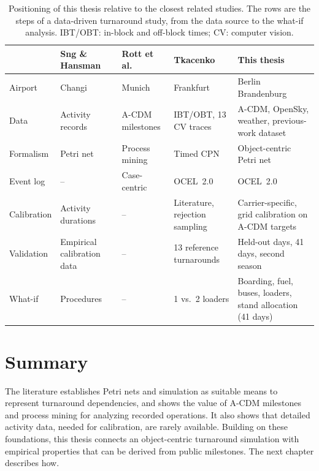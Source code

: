 \begin{table}[htbp]\centering\footnotesize
\begin{tabular}{p{2.1cm}p{2.2cm}p{2.2cm}p{2.4cm}p{2.7cm}}\hline
& Sng \& Hansman~\cite{sng2019petri} & Rott et al.~\cite{rott2023processmining} & Tkacenko~\cite{tkacenko2026} & This thesis\\\hline
Airport & Changi & Munich & Frankfurt & Berlin Brandenburg\\\hline
Data & Activity records & A-CDM milestones & IBT/OBT, 13 CV traces & A-CDM, OpenSky, weather, previous-work dataset\\\hline
Formalism & Petri net & Process mining & Timed CPN & Object-centric Petri net\\\hline
Event log & -- & Case-centric & OCEL~2.0 & OCEL~2.0\\\hline
Calibration & Activity durations & -- & Literature, rejection sampling & Carrier-specific, grid calibration on A-CDM targets\\\hline
Validation & Empirical calibration data & -- & 13 reference turnarounds & Held-out days, 41 days, second season\\\hline
What-if & Procedures & -- & 1 vs.\ 2 loaders & Boarding, fuel, buses, loaders, stand allocation (41 days)\\\hline
\end{tabular}
\caption{Positioning of this thesis relative to the closest related studies. The rows are the steps of a data-driven turnaround study, from the data source to the what-if analysis. IBT/OBT: in-block and off-block times; CV: computer vision.}
\label{tab:positioning}
\end{table}

\section{Summary}

The literature establishes Petri nets and simulation as suitable means to represent turnaround dependencies, and shows the value of A-CDM milestones and process mining for analyzing recorded operations. It also shows that detailed activity data, needed for calibration, are rarely available. Building on these foundations, this thesis connects an object-centric turnaround simulation with empirical properties that can be derived from public milestones. The next chapter describes how.
